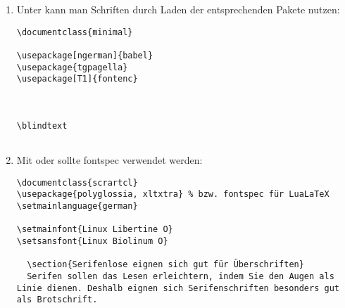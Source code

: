 % 


\begin{enumerate}[label=\alph*)]
		\item Unter  kann man Schriften durch Laden der entsprechenden Pakete nutzen:

\begin{lstlisting}
\documentclass{minimal}

\usepackage[ngerman]{babel}
\usepackage{tgpagella}
\usepackage[T1]{fontenc}



\blindtext


\end{lstlisting}


		\item Mit  oder  sollte fontspec verwendet werden: 

\begin{lstlisting}
\documentclass{scrartcl}
\usepackage{polyglossia, xltxtra} % bzw. fontspec für LuaLaTeX
\setmainlanguage{german}

\setmainfont{Linux Libertine O}
\setsansfont{Linux Biolinum O}

  \section{Serifenlose eignen sich gut für Überschriften}
  Serifen sollen das Lesen erleichtern, indem Sie den Augen als Linie dienen. Deshalb eignen sich Serifenschriften besonders gut als Brotschrift.

\end{lstlisting}

\end{enumerate}


